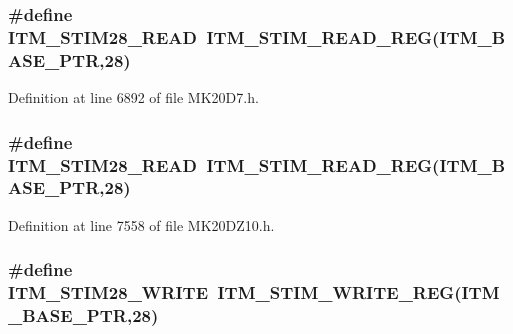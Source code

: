 \subsubsection[{\texorpdfstring{I\+T\+M\+\_\+\+S\+T\+I\+M28\+\_\+\+R\+E\+AD}{ITM_STIM28_READ}}]{\setlength{\rightskip}{0pt plus 5cm}\#define I\+T\+M\+\_\+\+S\+T\+I\+M28\+\_\+\+R\+E\+AD~{\bf I\+T\+M\+\_\+\+S\+T\+I\+M\+\_\+\+R\+E\+A\+D\+\_\+\+R\+EG}({\bf I\+T\+M\+\_\+\+B\+A\+S\+E\+\_\+\+P\+TR},28)}\hypertarget{group___i_t_m___register___accessor___macros_gaeedb9934131b7f1d727aab5f0282751f}{}\label{group___i_t_m___register___accessor___macros_gaeedb9934131b7f1d727aab5f0282751f}


Definition at line 6892 of file M\+K20\+D7.\+h.

\subsubsection[{\texorpdfstring{I\+T\+M\+\_\+\+S\+T\+I\+M28\+\_\+\+R\+E\+AD}{ITM_STIM28_READ}}]{\setlength{\rightskip}{0pt plus 5cm}\#define I\+T\+M\+\_\+\+S\+T\+I\+M28\+\_\+\+R\+E\+AD~{\bf I\+T\+M\+\_\+\+S\+T\+I\+M\+\_\+\+R\+E\+A\+D\+\_\+\+R\+EG}({\bf I\+T\+M\+\_\+\+B\+A\+S\+E\+\_\+\+P\+TR},28)}\hypertarget{group___i_t_m___register___accessor___macros_gaeedb9934131b7f1d727aab5f0282751f}{}\label{group___i_t_m___register___accessor___macros_gaeedb9934131b7f1d727aab5f0282751f}


Definition at line 7558 of file M\+K20\+D\+Z10.\+h.

\subsubsection[{\texorpdfstring{I\+T\+M\+\_\+\+S\+T\+I\+M28\+\_\+\+W\+R\+I\+TE}{ITM_STIM28_WRITE}}]{\setlength{\rightskip}{0pt plus 5cm}\#define I\+T\+M\+\_\+\+S\+T\+I\+M28\+\_\+\+W\+R\+I\+TE~{\bf I\+T\+M\+\_\+\+S\+T\+I\+M\+\_\+\+W\+R\+I\+T\+E\+\_\+\+R\+EG}({\bf I\+T\+M\+\_\+\+B\+A\+S\+E\+\_\+\+P\+TR},28)}\hypertarget{group___i_t_m___register___accessor___macros_gadf3581234ae31f01dc8bbc5fe2d5fa06}{}\label{group___i_t_m___register___accessor___macros_gadf3581234ae31f01dc8bbc5fe2d5fa06}


